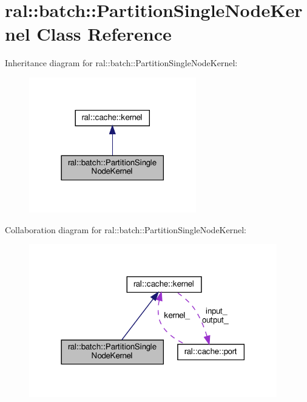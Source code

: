 \hypertarget{classral_1_1batch_1_1PartitionSingleNodeKernel}{}\section{ral\+:\+:batch\+:\+:Partition\+Single\+Node\+Kernel Class Reference}
\label{classral_1_1batch_1_1PartitionSingleNodeKernel}


Inheritance diagram for ral\+:\+:batch\+:\+:Partition\+Single\+Node\+Kernel\+:\nopagebreak
\begin{figure}[H]
\begin{center}
\leavevmode
\includegraphics[width=206pt]{classral_1_1batch_1_1PartitionSingleNodeKernel__inherit__graph}
\end{center}
\end{figure}


Collaboration diagram for ral\+:\+:batch\+:\+:Partition\+Single\+Node\+Kernel\+:\nopagebreak
\begin{figure}[H]
\begin{center}
\leavevmode
\includegraphics[width=306pt]{classral_1_1batch_1_1PartitionSingleNodeKernel__coll__graph}
\end{center}
\end{figure}
